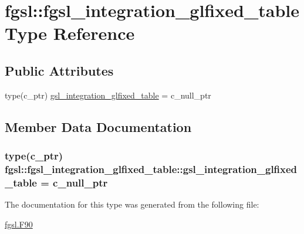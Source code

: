 \hypertarget{structfgsl_1_1fgsl__integration__glfixed__table}{\section{fgsl\-:\-:fgsl\-\_\-integration\-\_\-glfixed\-\_\-table Type Reference}
\label{structfgsl_1_1fgsl__integration__glfixed__table}
}
\subsection*{Public Attributes}
\begin{DoxyCompactItemize}
\item 
type(c\-\_\-ptr) \hyperlink{structfgsl_1_1fgsl__integration__glfixed__table_a234ee30769fac15a9b4323135a796d3e}{gsl\-\_\-integration\-\_\-glfixed\-\_\-table} = c\-\_\-null\-\_\-ptr
\end{DoxyCompactItemize}


\subsection{Member Data Documentation}
\hypertarget{structfgsl_1_1fgsl__integration__glfixed__table_a234ee30769fac15a9b4323135a796d3e}{
\subsubsection[{gsl\-\_\-integration\-\_\-glfixed\-\_\-table}]{\setlength{\rightskip}{0pt plus 5cm}type(c\-\_\-ptr) fgsl\-::fgsl\-\_\-integration\-\_\-glfixed\-\_\-table\-::gsl\-\_\-integration\-\_\-glfixed\-\_\-table = c\-\_\-null\-\_\-ptr}}\label{structfgsl_1_1fgsl__integration__glfixed__table_a234ee30769fac15a9b4323135a796d3e}


The documentation for this type was generated from the following file\-:\begin{DoxyCompactItemize}
\item 
\hyperlink{fgsl_8F90}{fgsl.\-F90}\end{DoxyCompactItemize}
